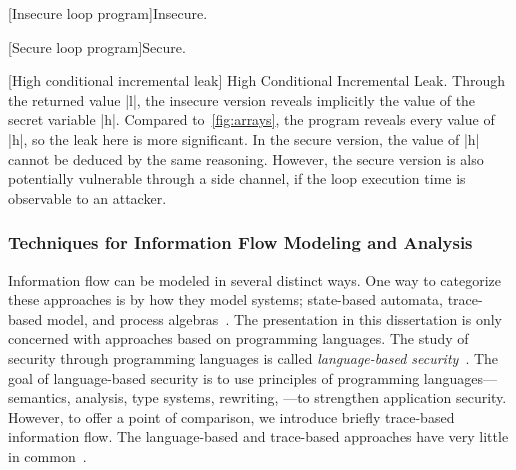 \begin{center}
\begin{minipage}{\textwidth}
\begin{minipage}{.45\textwidth}
[Insecure loop program]{Insecure.}
\label{ni-loop-insecure}
\end{minipage}\hfill
\begin{minipage}{.45\textwidth}
[Secure loop program]{Secure.}
\label{ni-loop-secure}
\end{minipage}
[High conditional incremental leak]{
{High Conditional Incremental Leak.}
Through the returned value \pr|l|, the insecure version reveals implicitly the value of the secret variable \pr|h|.
Compared to~\autoref{fig:arrays}, the program reveals every value of \pr|h|, so the leak here is more significant.
In the secure version, the value of \pr|h| cannot be deduced by the same reasoning.
However, the secure version is also potentially vulnerable through a side channel,
if the loop execution time is observable to an attacker.}
\label{fig:hi-cond}
\end{minipage}
\end{center}

\subsubsection{Techniques for Information Flow Modeling and Analysis}
\label{if-techniques}

Information flow can be modeled in several distinct ways.
One way to categorize these approaches is by how they model systems;
\eg state-based automata, trace-based model, and process algebras~\cite{vandermeyden2007}.
The presentation in this dissertation is only concerned with approaches based on programming languages.
The study of security through programming languages is called 
{\emph{language-based security}}~\cite{schneider2001,sabelfeld2003}.
The goal of {language-based security} is to use principles of programming languages---semantics, analysis, type systems, rewriting, \etc---to strengthen application security.
However, to offer a point of comparison, we introduce briefly trace-based information flow.
The language-based and trace-based approaches have very little in common~\cite[p. 235]{eggert2014}.

